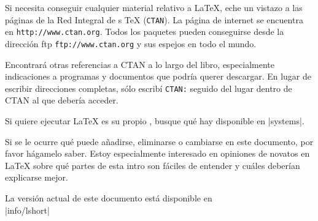 %
Si necesita conseguir cualquier material relativo a \LaTeX{}, eche un vistazo a las páginas de la Red Integral de \Filenomo{}s \TeX{} (\texttt{CTAN}).  La página de internet se encuentra en \texttt{http://www.ctan.org}.  Todos los paquetes pueden conseguirse desde la dirección ftp \texttt{ftp://www.ctan.org} y sus espejos en todo el mundo.

Encontrará otras referencias a CTAN a lo largo del libro, especialmente indicaciones a programas y documentos que podría querer descargar.  En lugar de escribir direcciones completas, sólo escribí \texttt{CTAN:} seguido del lugar dentro de CTAN al que debería acceder.

Si quiere ejecutar \LaTeX{} es su propio \computernomo{}, busque qué hay disponible en \CTAN|systems|.

%
Si se le ocurre qué puede añadirse, eliminarse o cambiarse en este documento, por favor hágamelo saber. Estoy especialmente interesado en opiniones de novatos en \LaTeX{} sobre qué partes de esta intro son fáciles de entender y cuáles deberían explicarse mejor.

\bigskip
\begin{verse}
%
\end{verse}
La versión actual de este documento está disponible en\\
\CTAN|info/lshort|

\endinput